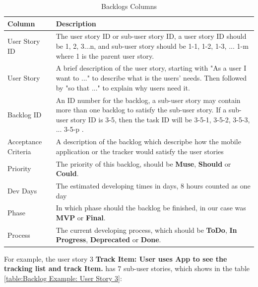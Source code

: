 \documentclass[12pt,a4paper]{article}
\begin{document}
          \begin{table}[H]
            \centering
              \begin{tabularx}{\textwidth}{l X}
                \hline
                Column & Description  \\ \hline
                User Story ID & The user story ID or sub-user story ID, a user story ID should be 1, 2, 3...n, and sub-user story should be 1-1, 1-2, 1-3, ... 1-m  where 1 is the parent user story.\\ 
                User Story & A brief description of the user story, starting with "As a user I want to ..." to describe what is the users' needs. Then followed by "so that ..." to explain why users need it. \\ 
                Backlog ID & An ID number for the backlog, a sub-user story may contain more than one backlog to satisfy the sub-user story. If a sub-user story ID is  3-5, then the task ID will be 3-5-1, 3-5-2, 3-5-3, ... 3-5-p .  \\ 
                Acceptance Criteria & A description of the backlog which descripbe how the mobile application or the tracker would satisfy the user stories \\ 
                Priority & The priority of this backlog, should be {\bf Muse}, {\bf Should} or {\bf Could}. \\                  
                Dev Days & The estimated developing times in days, 8 hours counted as one day \\                  
                Phase & In which phase should the backlog be finished, in our case was {\bf MVP} or {\bf Final}. \\                  
                Process & The current developing process, which should be {\bf ToDo}, {\bf In Progress}, {\bf Deprecated} or {\bf Done}.  \\                  
                \hline
              \end{tabularx}
              \caption[Table caption text]{Backlogs Columns}
              \label{table:Backlogs Column}
          \end{table}
          
          For example, the user story 3 {\bf Track Item: User uses App to see the tracking list and track Item.} has 7 sub-user stories, which shows in the table \ref{table:Backlog Example: User Story 3}: 
          
\end{document}
